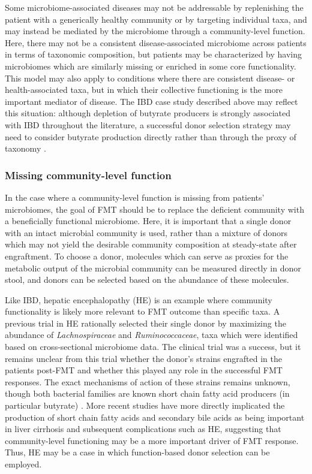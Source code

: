Some microbiome-associated diseases may not be addressable by replenishing the patient with a generically healthy community or by targeting individual taxa, and may instead be mediated by the microbiome through a community-level function.
Here, there may not be a consistent disease-associated microbiome across patients in terms of taxonomic composition, but patients may be characterized by having microbiomes which are similarly missing or enriched in some core functionality.
This model may also apply to conditions where there are consistent disease- or health-associated taxa, but in which their collective functioning is the more important mediator of disease.
The IBD case study described above may reflect this situation: although depletion of butyrate producers is strongly associated with IBD throughout the literature, a successful donor selection strategy may need to consider butyrate production directly rather than through the proxy of taxonomy \cite{Duvallet2017,Schirmer2018}.

\subsubsection{Missing community-level function}

In the case where a community-level function is missing from patients' microbiomes, the goal of FMT should be to replace the deficient community with a beneficially functional microbiome.
Here, it is important that a single donor with an intact microbial community is used, rather than a mixture of donors which may not yield the desirable community composition at steady-state after engraftment.
To choose a donor, molecules which can serve as proxies for the metabolic output of the microbial community can be measured directly in donor stool, and donors can be selected based on the abundance of these molecules.

Like IBD, hepatic encephalopathy (HE) is an example where community functionality is likely more relevant to FMT outcome than specific taxa.
A previous trial in HE \cite{Bajaj2017} rationally selected their single donor by maximizing the abundance of \textit{Lachnospiraceae} and \textit{Ruminococcaceae}, taxa which were identified based on cross-sectional microbiome data.
The clinical trial was a success, but it remains unclear from this trial whether the donor's strains engrafted in the patients post-FMT and whether this played any role in the successful FMT responses.
The exact mechanisms of action of these strains remains unknown, though both bacterial families are known short chain fatty acid producers (in particular butyrate) \cite{Vital2017}.
More recent studies have more directly implicated the production of short chain fatty acids and secondary bile acids as being important in liver cirrhosis and subsequent complications such as HE, suggesting that community-level functioning may be a more important driver of FMT response.
Thus, HE may be a case in which function-based donor selection can be employed.


